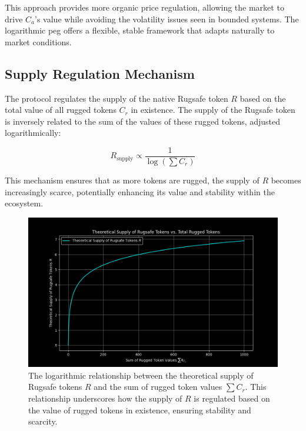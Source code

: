\documentclass{article}
\begin{document}
This approach provides more organic price regulation, allowing the market to drive $C_a$’s value while avoiding the volatility issues seen in bounded systems. The logarithmic peg offers a flexible, stable framework that adapts naturally to market conditions.












\subsection{Supply Regulation Mechanism}
The protocol regulates the supply of the native Rugsafe token $R$ based on the total value of all rugged tokens $C_r$ in existence. The supply of the Rugsafe token is inversely related to the sum of the values of these rugged tokens, adjusted logarithmically:

\begin{equation}
R_\text{supply}  \propto \frac{1}{\log\left(\sum C_r\right)}
\end{equation}

This mechanism ensures that as more tokens are rugged, the supply of $R$ becomes increasingly scarce, potentially enhancing its value and stability within the ecosystem.

\begin{figure}[h]
\centering
\includegraphics[width=\textwidth]{images/5.png}
\caption{The logarithmic relationship between the theoretical supply of Rugsafe tokens $R$ and the sum of rugged token values $\sum C_r$. This relationship underscores how the supply of $R$ is regulated based on the value of rugged tokens in existence, ensuring stability and scarcity.}
\label{fig:minted_anticoins}
\end{figure}
\end{document}
